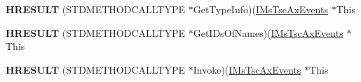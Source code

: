 \begin{DoxyCompactItemize}
{\bfseries H\+R\+E\+S\+U\+LT} (S\+T\+D\+M\+E\+T\+H\+O\+D\+C\+A\+L\+L\+T\+Y\+PE $\ast$Get\+Type\+Info)(\hyperlink{interface_m_s_t_s_c_lib_1_1_i_ms_tsc_ax_events}{I\+Ms\+Tsc\+Ax\+Events} $\ast$This
\item 
\mbox{\label{struct_m_s_t_s_c_lib_1_1_i_ms_tsc_ax_events_vtbl_a1a7e8db4491e5bb0e2e63f23a3d1e3e4}} 
{\bfseries H\+R\+E\+S\+U\+LT} (S\+T\+D\+M\+E\+T\+H\+O\+D\+C\+A\+L\+L\+T\+Y\+PE $\ast$Get\+I\+Ds\+Of\+Names)(\hyperlink{interface_m_s_t_s_c_lib_1_1_i_ms_tsc_ax_events}{I\+Ms\+Tsc\+Ax\+Events} $\ast$This
\item 
\mbox{\label{struct_m_s_t_s_c_lib_1_1_i_ms_tsc_ax_events_vtbl_afdb4973c5a2f5f455e2a9910b0c622c1}} 
{\bfseries H\+R\+E\+S\+U\+LT} (S\+T\+D\+M\+E\+T\+H\+O\+D\+C\+A\+L\+L\+T\+Y\+PE $\ast$Invoke)(\hyperlink{interface_m_s_t_s_c_lib_1_1_i_ms_tsc_ax_events}{I\+Ms\+Tsc\+Ax\+Events} $\ast$This
\end{DoxyCompactItemize}
